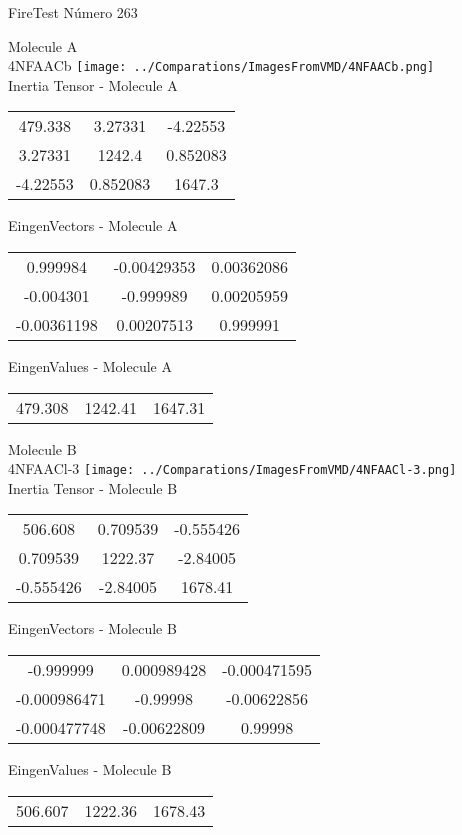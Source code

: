 \vtab[-2cm]
\begin{center}
{\large FireTest \tab Número 263}
\end{center}
\begin{multicols}{2}
\begin{center}

Molecule A \\ 
4NFAACb
\texttt{[image: ../Comparations/ImagesFromVMD/4NFAACb.png]}
\\
Inertia Tensor - Molecule A \\
\vtab

\begin{tabular}{|c c c|}
479.338	 & 	3.27331	 & 	-4.22553	 \\
3.27331	 & 	1242.4	 & 	0.852083	 \\
-4.22553	 & 	0.852083	 & 	1647.3
\end{tabular}

\vtab
 EingenVectors - Molecule A     \\
\vtab
\begin{tabular}{|c c c|}
0.999984	 & 	-0.00429353	 & 	0.00362086	 \\
-0.004301	 & 	-0.999989	 & 	0.00205959	 \\
-0.00361198	 & 	0.00207513	 & 	0.999991
\end{tabular}

\vtab
 EingenValues - Molecule A     \\
\vtab
\begin{tabular}{|c c c|}
479.308	 & 	1242.41	 & 	1647.31	 \\
\end{tabular}
\columnbreak

Molecule B \\ 
4NFAACl-3
\texttt{[image: ../Comparations/ImagesFromVMD/4NFAACl-3.png]}
\\
Inertia Tensor - Molecule B \\
\vtab

\begin{tabular}{|c c c|}
506.608	 & 	0.709539	 & 	-0.555426	 \\
0.709539	 & 	1222.37	 & 	-2.84005	 \\
-0.555426	 & 	-2.84005	 & 	1678.41
\end{tabular}

\vtab
 EingenVectors - Molecule B     \\
\vtab
\begin{tabular}{|c c c|}
-0.999999	 & 	0.000989428	 & 	-0.000471595	 \\
-0.000986471	 & 	-0.99998	 & 	-0.00622856	 \\
-0.000477748	 & 	-0.00622809	 & 	0.99998
\end{tabular}

\vtab
 EingenValues - Molecule B     \\
\vtab
\begin{tabular}{|c c c|}
506.607	 & 	1222.36	 & 	1678.43	 \\
\end{tabular}

\end{center}
\end{multicols}

